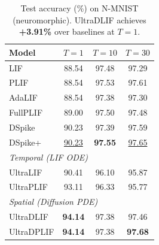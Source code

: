\documentclass{article}
\theoremstyle{plain}
\theoremstyle{definition}
\theoremstyle{remark}
\begin{document}
\begin{table}[t]
\caption{Test accuracy (\%) on N-MNIST (neuromorphic). UltraDLIF achieves \textbf{+3.91\%} over baselines at $T{=}1$.}
\label{tab:nmnist}
\vskip 0.1in
\begin{center}
\begin{small}
\begin{tabular}{lccc}
\toprule
Model & $T{=}1$ & $T{=}10$ & $T{=}30$ \\
\midrule
LIF        & 88.54 & 97.48 & 97.29 \\
PLIF       & 88.54 & 97.53 & 97.61 \\
AdaLIF     & 88.54 & 97.38 & 97.30 \\
FullPLIF   & 89.00 & 97.50 & 97.48 \\
DSpike     & 90.23 & 97.39 & 97.59 \\
DSpike+    & \underline{90.23} & \textbf{97.55} & \underline{97.65} \\
\midrule
\multicolumn{4}{l}{\textit{Temporal (LIF ODE)}} \\
UltraLIF   & 90.41 & 96.10 & 95.87 \\
UltraPLIF  & 93.11 & 96.33 & 95.77 \\
\midrule
\multicolumn{4}{l}{\textit{Spatial (Diffusion PDE)}} \\
UltraDLIF  & \textbf{94.14} & 97.38 & 97.46 \\
UltraDPLIF & \textbf{94.14} & 97.38 & \textbf{97.68} \\
\bottomrule
\end{tabular}
\end{small}
\end{center}
\vskip -0.1in
\end{table}
\end{document}
